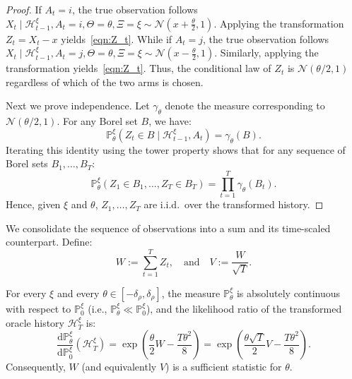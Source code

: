 \documentclass[10pt]{article}
\newcommand{\dd}{\mathrm{d}}
\theoremstyle{plain}
\begin{document}
\begin{proof}
If $A_t=i$, the true observation follows
$X_t \mid \mathcal{H}_{t-1}^{\xi},A_t=i,\Theta=\theta,\Xi=\xi \sim \mathcal{N}\!\left(x+\frac{\theta}{2},1\right).$
Applying the transformation $Z_t=X_t-x$ yields~\eqref{eqn:Z_t}.
While if $A_t=j$, the true observation follows $X_t \mid \mathcal{H}_{t-1}^{\xi},A_t=j,\Theta=\theta,\Xi=\xi \sim \mathcal{N}\!\left(x-\frac{\theta}{2},1\right)$. Similarly, applying the transformation yields~\eqref{eqn:Z_t}.
Thus, the conditional law of $Z_t$ is  $\mathcal{N}(\theta/2,1)$ regardless of which of the two arms is chosen.

Next we prove independence. Let $\gamma_\theta$ denote the measure corresponding to $\mathcal{N}(\theta/2,1)$. For any Borel set $B$, we have:
$$\mathbb{P}_\theta^{\xi}(Z_t\in B\mid \mathcal{H}_{t-1}^{\xi},A_t)=\gamma_\theta(B).$$
Iterating this identity using the tower property shows that  for any sequence of Borel sets $B_1,\dots,B_T$:
$$\mathbb{P}_\theta^{\xi}(Z_1\in B_1,\dots,Z_T\in B_T)=\prod_{t=1}^T\gamma_\theta(B_t).$$
Hence, given $\xi$ and $\theta$, $Z_1,\dots,Z_T$ are i.i.d.\ over the transformed history.  
\end{proof}

We consolidate the sequence of observations into a sum and its time-scaled counterpart. Define:
$$W:=\sum_{t=1}^T Z_t, \quad\mbox{and}\quad V:=\frac{W}{\sqrt{T}}.$$

\begin{lemma}
\label{lem:local-lr-W}
For every $\xi$ and every $\theta\in[-\delta_{\rho},\delta_{\rho}]$, the measure $\mathbb{P}_\theta^{\xi}$ is absolutely continuous with respect to $\mathbb{P}_0^{\xi}$ (i.e., $\mathbb{P}_\theta^{\xi}\ll \mathbb{P}_0^{\xi}$), and the likelihood ratio of the transformed oracle history $\mathcal{H}_T^{\xi}$ is:
$$\frac{\dd\mathbb{P}_\theta^{\xi}}{\dd\mathbb{P}_0^{\xi}}(\mathcal{H}_T^{\xi})
=\exp\!\left(\frac{\theta}{2}W-\frac{T\theta^2}{8}\right)
=\exp\!\left(\frac{\theta\sqrt{T}}{2}V-\frac{T\theta^2}{8}\right).$$
Consequently, $W$ (and equivalently $V$) is a sufficient statistic for $\theta$.
\end{lemma}
\end{document}
